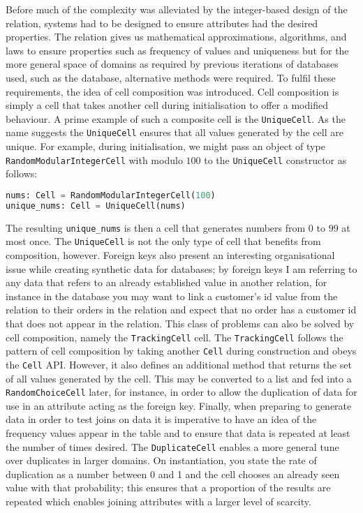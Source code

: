 Before much of the complexity was alleviated by the integer-based design of the
 relation, systems had to be designed to ensure attributes had
the desired properties. The  relation gives us mathematical
approximations, algorithms, and laws to ensure properties such as frequency of
values and uniqueness but for the more general space of domains as required by
previous iterations of databases used, such as the  database,
alternative methods were required. To fulfil these requirements, the idea of cell
composition was introduced. Cell composition is simply a cell that takes another cell
during initialisation to offer a modified behaviour. A prime example of such a
composite cell is the \lstinline{UniqueCell}. As the name suggests the
\lstinline{UniqueCell} ensures that all values generated by the cell are unique.
For example, during initialisation, we might pass an object of type
\lstinline{RandomModularIntegerCell} with modulo $100$ to the
\lstinline{UniqueCell} constructor as follows:
\begin{lstlisting}[language=Python]
nums: Cell = RandomModularIntegerCell(100)
unique_nums: Cell = UniqueCell(nums)
\end{lstlisting}
The resulting \lstinline{unique_nums} is then a cell that generates numbers from
$0$ to $99$ at most once. The \lstinline{UniqueCell} is not the only type of
cell that benefits from composition, however. Foreign keys also present an
interesting organisational issue while creating synthetic data for databases; by
foreign keys I am referring to any data that refers to an already established
value in another relation, for instance in the  database you
may want to link a customer's id value from the  relation to
their orders in the  relation and expect that no order has a
customer id that does not appear in the  relation. This class
of problems can also be solved by cell composition, namely the
\lstinline{TrackingCell} cell. The \lstinline{TrackingCell} follows the
pattern of cell composition by taking another \lstinline{Cell} during
construction and obeys the \lstinline{Cell} API. However, it also defines an
additional method that returns the set of all values generated by the cell. This
may be converted to a list and fed into a \lstinline{RandomChoiceCell} later, for
instance, in order to allow the duplication of data for use in an attribute
acting as the foreign key.
Finally, when preparing to generate data in order to test joins on data it is
imperative to have an idea of the frequency values appear in the table and to ensure
that data is repeated at least the number of times desired. The
\lstinline{DuplicateCell} enables a more general tune over duplicates in larger
domains. On instantiation, you state the rate of duplication as a number
between 0 and 1 and the cell chooses an already seen value with that
probability; this ensures that a proportion of the results are repeated which 
enables joining attributes with a larger level of scarcity.


